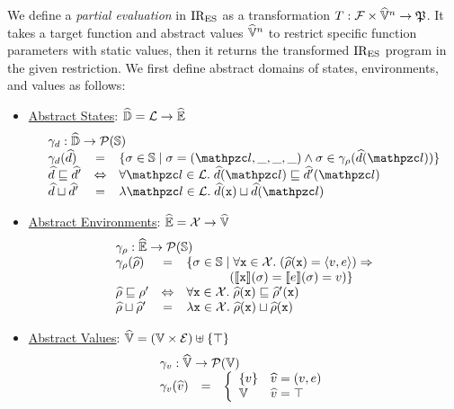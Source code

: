 We define a \textit{partial evaluation} in $\text{IR}_\text{ES}$ as a transformation
$T: \mathcal{F} \times \widehat{\mathbb{V}}^n \rightarrow \mathfrak{P}$.  It takes a
target function and abstract values $\widehat{\mathbb{V}}^n$ to restrict specific function
parameters with static values, then it returns the transformed $\text{IR}_\text{ES}$ program
in the given restriction.  We first define abstract domains of states,
environments, and values as follows:
\begin{itemize}
  \item \underline{Abstract States}: $\widehat{\mathbb{D}} = \mathcal{L} \rightarrow \widehat{\mathbb{E}}$
    \[
      \begin{array}{lcl}
        \multicolumn{3}{l}{\elemgamma: \aelemset \rightarrow \powerset{\stset}}\\
        \elemgamma(\aelem) &=& \{ \st \in \stset \mid \st = (\lab, \_, \_, \_)
        \wedge \st \in \envgamma(\aelem(\lab)) \}\\

        \aelem \order \aelem' &\Leftrightarrow& \forall \lab \in \labset. \;
        \aelem(\lab) \order \aelem'(\lab)\\

        \aelem \join \aelem' &=& \lambda \lab \in \labset. \; \aelem(\varx) \join
        \aelem(\lab)\\
      \end{array}
    \]
  \item \underline{Abstract Environments}: $\widehat{\mathbb{E}} = \mathcal{X} \rightarrow
    \widehat{\mathbb{V}}$
    \[
      \begin{array}{lcl}
        \multicolumn{3}{l}{\envgamma: \aenvset \rightarrow \powerset{\stset}}\\
        \envgamma(\aenv) &=& \{ \st \in \stset \mid \forall \varx \in \varset.
          \; (\aenv(\varx) = \langle \val, \expr \rangle) \Rightarrow\\ &&
          \phantom{\{ \st \in \stset \mid} (\sem{\varx}(\st) = \sem{\expr}(\st) =
          \val) \}\\

        \aenv \order \env' &\Leftrightarrow& \forall \varx \in \varset. \;
        \aenv(\varx) \order \aenv'(\varx)\\

        \aenv \join \aenv' &=& \lambda \varx \in \varset. \; \aenv(\varx) \join
        \aenv(\varx)\\
      \end{array}
    \]
  \item \underline{Abstract Values}: $\widehat{\mathbb{V}} = (\mathbb{V} \times \mathcal{E})
    \uplus \{ \top \}$
    \[
      \begin{array}{lcl}
        \multicolumn{3}{l}{\valgamma: \avalset \rightarrow \powerset{\valset}}\\
        \valgamma(\aval) &=& \left\{
          \begin{array}{ll}
            \{ \val \} & \aval = (\val, \expr) \\
            \valset & \aval = \top\\
          \end{array}
        \right.\\


\end{array}\]
\end{itemize}

